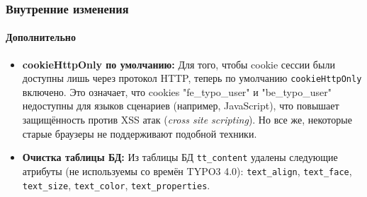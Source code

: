 \begin{frame}[fragile]
	\frametitle{Внутренние изменения}
	\framesubtitle{Дополнительно}

	\begin{itemize}

		\item \textbf{cookieHttpOnly по умолчанию:}\newline
			\small
				Для того, чтобы cookie сессии были доступны лишь через протокол HTTP,
				теперь по умолчанию \texttt{cookieHttpOnly} включено.\newline
				Это означает, что cookies "fe\_typo\_user" и "be\_typo\_user" недоступны для языков сценариев (например, JavaScript), что повышает защищённость против XSS атак (\textit{cross site scripting}). Но все же, некоторые старые браузеры не поддерживают подобной техники.
			\normalsize

		\item \textbf{Очистка таблицы БД:}\newline
			\small
				Из таблицы БД \texttt{tt\_content} удалены следующие атрибуты (не используемы со времён TYPO3 4.0):
				\texttt{text\_align}, \texttt{text\_face}, \texttt{text\_size}, \texttt{text\_color}, \texttt{text\_properties}.
			\normalsize

	\end{itemize}

\end{frame}



